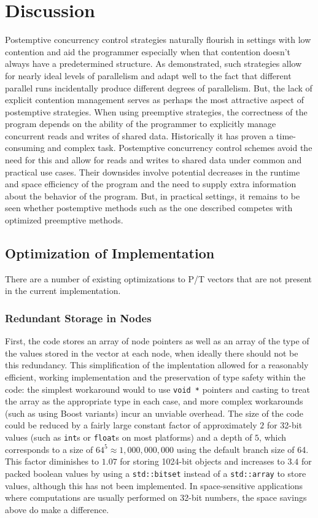 \chapter{Discussion}

Postemptive concurrency control strategies naturally flourish in settings with
low contention and aid the programmer especially when that contention doesn't
always have a predetermined structure. As demonstrated, such strategies allow
for nearly ideal levels of parallelism and adapt well to the fact that different
parallel runs incidentally produce different degrees of parallelism. But, the
lack of explicit contention management serves as perhaps the most attractive
aspect of postemptive strategies. When using preemptive strategies, the
correctness of the program depends on the ability of the programmer to
explicitly manage concurrent reads and writes of shared data. Historically it
has proven a time-consuming and complex task. Postemptive concurrency control
schemes avoid the need for this and allow for reads and writes to shared data
under common and practical use cases. Their downsides involve potential
decreases in the runtime and space efficiency of the program and the need to
supply extra information about the behavior of the program. But, in practical
settings, it remains to be seen whether postemptive methods such as the one
described competes with optimized preemptive methods.

\section{Optimization of Implementation}
There are a number of existing optimizations to P/T vectors that are not present
in the current implementation.

\subsection{Redundant Storage in Nodes}
First, the code stores an array of node pointers
as well as an array of the type of the values stored in the vector at each node,
when ideally there should not be this redundancy. This simplification of the
implentation allowed for a reasonably efficient, working implementation and the
preservation of type safety within the code: the simplest workaround would to
use \texttt{void *} pointers and casting to treat the array as the appropriate
type in each case, and more complex workarounds (such as using Boost variants)
incur an unviable overhead. The size of the code could be reduced by a fairly
large constant factor of approximately $2$ for 32-bit values (such as
\texttt{int}s or \texttt{float}s on most platforms) and a depth of $5$, which
corresponds to a size of $64^5 \approx 1,000,000,000$ using the default branch
size of 64. This factor diminishes to $1.07$ for storing 1024-bit objects and
increases to $3.4$ for packed boolean values by using a \texttt{std::bitset}
instead of a \texttt{std::array} to store values, although this has not been
implemented. In space-sensitive applications where computations are usually
performed on 32-bit numbers, the space savings above do make a difference.

